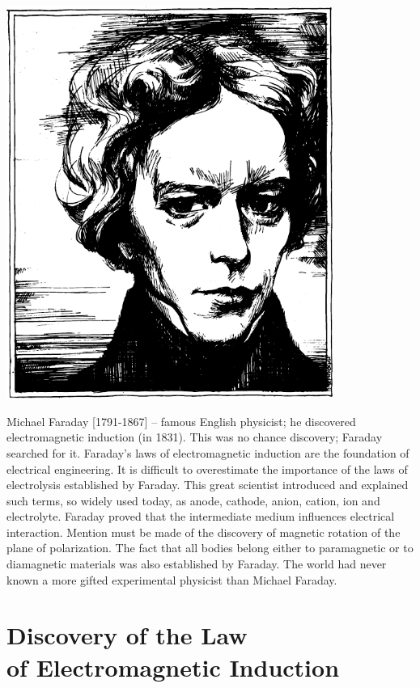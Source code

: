 \begin{center}
\includegraphics[width=0.8\textwidth]{figures/faraday.pdf}
\end{center}
{\small \textsf{{Michael Faraday [1791-1867]} -- \textsf{\footnotesize famous English physicist; he discovered electromagnetic induction (in 1831). This was no chance discovery; Faraday searched for it. Faraday's laws of electromagnetic induction are the foundation of electrical engineering. It is difficult to overestimate the importance of the laws of electrolysis established by Faraday. This great scientist introduced and explained such terms, so widely used today, as anode, cathode, anion, cation, ion and electrolyte. Faraday proved that the intermediate medium influences electrical interaction. Mention must be made of the discovery of magnetic rotation of the plane of polarization. The fact that all bodies belong either to paramagnetic or to diamagnetic materials was also established by Faraday. The world had never known a more gifted experimental physicist than Michael Faraday.}}}




\section[Discovery of the Law of EMI]{Discovery of the Law \\of Electromagnetic Induction}
\normalfont

